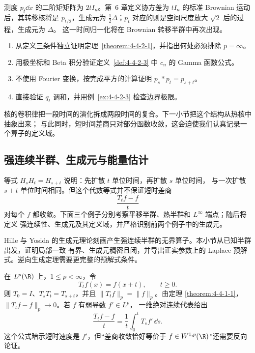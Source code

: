 \begin{remark}
测度 $p_t\dd x$ 的二阶矩矩阵为 $2tI_n$。第~6 章定义协方差为
$tI_n$ 的标准 Brownian 运动后，其转移核将是 $p_{t/2}$，生成元为
$\tfrac12\Delta$；$p_t$ 对应的则是空间尺度放大 $\sqrt2$ 后的过程，生成元为 $\Delta$。
这一时间归一化将在 Brownian 转移半群中再次出现。
\end{remark}

\begin{exercise}
\begin{enumerate}
  \item 从定义三条件独立证明定理~\ref{theorem:4-4-2-1}，并指出何处必须排除 $p=\infty$。
  \item 用极坐标和 Beta 积分验证定义~\ref{def:4-4-2-3} 中 $c_n$ 的 Gamma 函数公式。
  \item 不使用 Fourier 变换，按完成平方的计算证明 $p_s*p_t=p_{s+t}$。
  \item 直接验证 $q_t$ 调和，并用例~\ref{ex:4-4-2-3} 检查边界极限。
\end{enumerate}
\end{exercise}

核的卷积律把一段时间的演化拆成两段时间的复合。下一小节把这个结构从热核中抽象出来；
与此同时，短时间差商只对部分函数收敛，这会迫使我们认真记录一个算子的定义域。


\subsection{强连续半群、生成元与能量估计}\label{subsec:4-4-3}

等式 $H_sH_t=H_{s+t}$ 说明：先扩散 $t$ 单位时间，再扩散 $s$ 单位时间，
与一次扩散 $s+t$ 单位时间相同。但这个代数等式并不保证短时差商
\[
  \frac{T_tf-f}{t}
\]
对每个 $f$ 都收敛。下面三个例子分别考察平移半群、热半群和 $L^\infty$ 端点；随后将定义
强连续性、生成元及其定义域，并严格识别前两个例子中的生成元。

Hille 与 Yosida 的生成元理论刻画产生强连续半群的无界算子。本小节从已知半群出发，证明局部一致
有界、生成元稠密且闭，并导出正实参数上的 Laplace 预解式。逆向生成定理需要更完整的预解式条件。

\begin{example}[平移半群]\label{ex:4-4-3-1}
在 $L^p(\R)$ 上，$1\le p<\infty$，令
\[
  T_tf(x)=f(x+t),\qquad t\ge0.
\]
则 $T_0=I$、$T_sT_t=T_{s+t}$，并且 $\|T_tf\|_p=\|f\|_p$。由定理
\ref{theorem:4-4-1-1}，$\|T_tf-f\|_p\to0$。若 $f$ 有弱导数 $f'\in L^p$，
一维绝对连续代表给出
\[
  \frac{T_tf-f}{t}=\frac1t\int_0^t T_sf'\,\dd s.
\]
这个公式暗示短时速度是 $f'$，但“差商收敛恰好等价于
$f\in W^{1,p}(\R)$”还需要反向论证。
\end{example}

